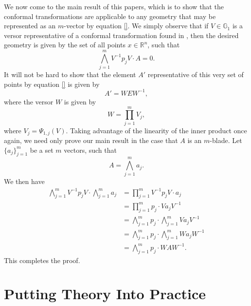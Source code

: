 \documentclass{ecgd-l}
\theoremstyle{definition}
\theoremstyle{remark}
\numberwithin{equation}{section}
\newcommand{\G}{\mathbb{G}}
\newcommand{\R}{\mathbb{R}}
\begin{document}
We now come to the main result of this papers, which is to show
that the conformal transformations are applicable to any geometry
that may be represented as an $m$-vector by equation \eqref{}.
We simply observe that if $V\in\G_1$ is a versor representative
of a conformal transformation found in \cite{}, then the desired
geometry is given by the set of all points $x\in\R^n$, such that
\begin{equation*}
\bigwedge_{j=1}^m V^{-1}p_jV\cdot A=0.
\end{equation*}
It will not be hard to show that the element $A'$ representative
of this very set of points by equation \eqref{} is given by
\begin{equation*}
A' = WEW^{-1},
\end{equation*}
where the versor $W$ is given by
\begin{equation*}
W = \prod_{j=1}^m V_j,
\end{equation*}
where $V_j=\Psi_{1,j}(V)$.
Taking advantage of the linearity of the inner product once again,
we need only prove our main result in the case that $A$ is an $m$-blade.
Let $\{a_j\}_{j=1}^m$ be a set $m$ vectors, such that
\begin{equation*}
A = \bigwedge_{j=1}^m a_j.
\end{equation*}
We then have
\begin{align*}
\bigwedge_{j=1}^m V^{-1}p_jV\cdot\bigwedge_{j=1}^m a_j &= \prod_{j=1}^m V^{-1}p_jV\cdot a_j \\
 &= \prod_{j=1}^m p_j\cdot Va_jV^{-1} \\
&= \bigwedge_{j=1}^m p_j\cdot\bigwedge_{j=1}^m Va_jV^{-1} \\
&= \bigwedge_{j=1}^m p_j\cdot\bigwedge_{j=1}^m Wa_jW^{-1} \\
&= \bigwedge_{j=1}^m p_j\cdot WAW^{-1}.
\end{align*}
This completes the proof.

\section{Putting Theory Into Practice}


\end{document}
